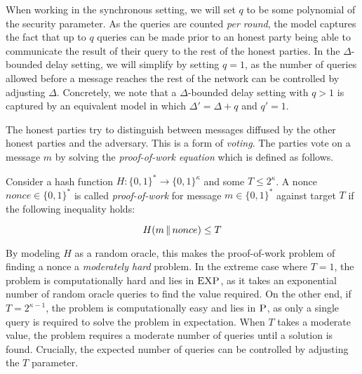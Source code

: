 When working in the synchronous setting, we will set $q$ to be some polynomial
of the security parameter. As the queries are counted \emph{per round}, the
model captures the fact that up to $q$ queries can be made prior to an honest
party being able to communicate the result of their query to the rest of the
honest parties. In the $\Delta$-bounded delay setting, we will simplify by
setting $q = 1$, as the number of queries allowed before a message reaches the
rest of the network can be controlled by adjusting $\Delta$. Concretely, we note
that a $\Delta$-bounded delay setting with $q > 1$ is captured by an equivalent
model in which $\Delta' = \Delta + q$ and $q' = 1$.

The honest parties try to distinguish between messages diffused by the other
honest parties and the adversary. This is a form of \emph{voting}. The parties
vote on a message $m$ by solving the \emph{proof-of-work equation} which is
defined as follows.

\begin{definition}
  Consider a hash function $H: \{0, 1\}^* \rightarrow \{0, 1\}^\kappa$ and some
  $T \leq 2^\kappa$.
  A nonce
  $nonce \in \{0, 1\}^*$ is called \emph{proof-of-work}
  for message $m \in \{0, 1\}^*$ against target $T$ if the following inequality
  holds:

  \[
  H(m \,\|\, nonce) \leq T
  \]
\end{definition}

By modeling $H$ as a random oracle, this makes the proof-of-work problem of
finding a nonce a \emph{moderately hard} problem. In the extreme case
where $T = 1$, the problem is computationally hard and lies in $\textsc{EXP}$,
as it takes an exponential number of random oracle queries to find the value
required.
On the other end, if $T = 2^{\kappa-1}$, the problem is computationally easy and
lies in $\textsc{P}$, as only a single query is required to solve the problem
in expectation. When $T$ takes a moderate value, the problem requires a moderate
number of queries until a solution is found. Crucially, the expected number of
queries can be controlled by adjusting the $T$ parameter.

